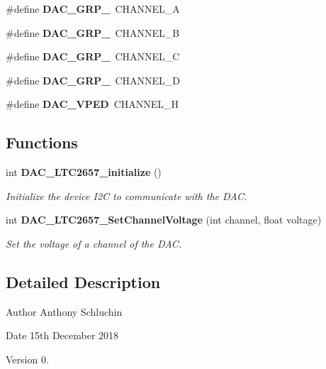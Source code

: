 \begin{DoxyCompactItemize}
\mbox{\label{iic___d_a_c___l_t_c2657_8h_a1ee468817a52afdaae4ad9dd6c26ffd6}} 
\#define {\bfseries D\+A\+C\+\_\+\+G\+R\+P\+\_}~C\+H\+A\+N\+N\+E\+L\+\_\+A
\item 
\mbox{\label{iic___d_a_c___l_t_c2657_8h_a7553e301a32d04e36fdc1f7d407c40eb}} 
\#define {\bfseries D\+A\+C\+\_\+\+G\+R\+P\+\_}~C\+H\+A\+N\+N\+E\+L\+\_\+B
\item 
\mbox{\label{iic___d_a_c___l_t_c2657_8h_a35bc5295652e07c0ed462db755a8749b}} 
\#define {\bfseries D\+A\+C\+\_\+\+G\+R\+P\+\_}~C\+H\+A\+N\+N\+E\+L\+\_\+C
\item 
\mbox{\label{iic___d_a_c___l_t_c2657_8h_a40d6c8cfc4052da2965aa829315403cd}} 
\#define {\bfseries D\+A\+C\+\_\+\+G\+R\+P\+\_}~C\+H\+A\+N\+N\+E\+L\+\_\+D
\item 
\mbox{\label{iic___d_a_c___l_t_c2657_8h_ac5933bb221aa4ae329cd34d835b6f15c}} 
\#define {\bfseries D\+A\+C\+\_\+\+V\+P\+ED}~C\+H\+A\+N\+N\+E\+L\+\_\+H
\end{DoxyCompactItemize}
\subsection*{Functions}
\begin{DoxyCompactItemize}
\item 
int \textbf{ D\+A\+C\+\_\+\+L\+T\+C2657\+\_\+initialize} ()
\begin{DoxyCompactList}\small\item\em Initialize the device I2C to communicate with the D\+AC. \end{DoxyCompactList}\item 
int \textbf{ D\+A\+C\+\_\+\+L\+T\+C2657\+\_\+\+Set\+Channel\+Voltage} (int channel, float voltage)
\begin{DoxyCompactList}\small\item\em Set the voltage of a channel of the D\+AC. \end{DoxyCompactList}\end{DoxyCompactItemize}


\subsection{Detailed Description}
\begin{DoxyAuthor}{Author}
Anthony Schluchin 
\end{DoxyAuthor}
\begin{DoxyDate}{Date}
15th December 2018 
\end{DoxyDate}
\begin{DoxyVersion}{Version}
0. 
\end{DoxyVersion}


